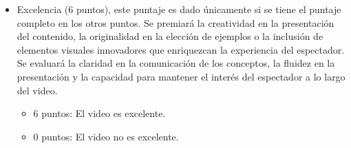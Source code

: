 \documentclass[a4,11pt]{aleph-notas}
\begin{document}
\begin{itemize}
\item
    Excelencia (6 puntos), este puntaje es dado únicamente si se tiene el puntaje completo en los otros puntos. Se premiará la creatividad en la presentación del contenido, la originalidad en la elección de ejemplos o la inclusión de elementos visuales innovadores que enriquezcan la experiencia del espectador. Se evaluará la claridad en la comunicación de los conceptos, la fluidez en la presentación y la capacidad para mantener el interés del espectador a lo largo del video.
    \begin{itemize}
        \item 6 puntos: El video es excelente.
        \item 0 puntos: El video no es excelente.
    \end{itemize}

\end{itemize}
\end{document}
